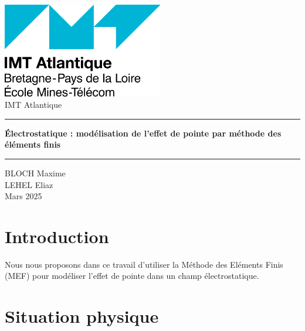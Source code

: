 \documentclass{article}
\begin{document}
\begin{titlepage}
    \begin{titlepage}      
        \begin{center}
            \includegraphics[width=7cm]{img/Logo_IMT_Atlantique.png}
            \\[1.9cm]
            {\LARGE IMT Atlantique}\\[1.5cm]
            
			{\color{black} \rule{\textwidth}{1pt}}

            \linespread{1.2}
            \vspace{0.5cm}
            \huge {\textbf{Électrostatique : modélisation de l'effet de pointe
             par méthode des éléments finis}}
            \vspace{1cm}
            \linespread{1.2}
			{\color{black} \rule{\textwidth}{1pt}}
            \Large {BLOCH Maxime} \\
            \Large {LEHEL Eliaz} \\[1cm]
            \Large {Mars 2025}
            
        \end{center}
    \end{titlepage}
\end{titlepage}

\renewcommand{\contentsname}{Sommaire}
\tableofcontents

\newpage

\section*{Introduction}

\hspace{1cm}
Nous nous proposons dans ce travail d'utiliser
la Méthode des Eléments Finis (MEF)
pour modéliser l'effet de pointe dans un champ électrostatique.\cite{Gossiaux}

\section{Situation physique}
\label{sec:situation_physique}
\end{document}
